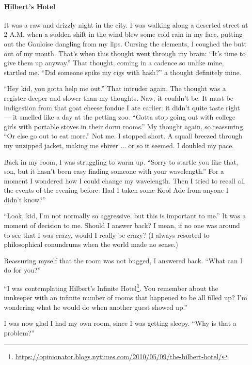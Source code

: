 \paragraph{Hilbert’s Hotel}

It was a raw and drizzly night in the city. I was walking along a deserted street at 2 A.M. when a sudden shift in the wind blew some cold rain in my face, putting out the Gauloise dangling from my lips. Cursing the elements, I coughed the butt out of my mouth. That's when this thought went through my brain: ``It's time to give them up anyway.'' That thought, coming in a cadence so unlike mine, startled me. ``Did someone spike my cigs with hash?'' a thought definitely mine.

``Hey kid, you gotta help me out.'' That intruder again. The thought was a register deeper and slower than my thoughts. Naw, it couldn't be. It must be indigestion from that goat cheese fondue I ate earlier; it didn't quite taste right --- it smelled like a day at the petting zoo. ``Gotta stop going out with college girls with portable stoves in their dorm rooms.'' My thought again, so reassuring. ``Or else go out to eat more.'' Not me. I stopped short. A squall breezed through my unzipped jacket, making me shiver ... or so it seemed. I doubled my pace.

Back in my room, I was struggling to warm up. ``Sorry to startle you like that, son, but it hasn't been easy finding someone with your wavelength.'' For a moment I wondered how I could change my wavelength. Then I tried to recall all the events of the evening before. Had I taken some Kool Ade from anyone I didn't know?''

``Look, kid, I'm not normally so aggressive, but this is important to me.'' It was a moment of decision to me. Should I answer back? I mean, if no one was around to see that I was crazy, would I really be crazy? (I always resorted to philosophical conundrums when the world made no sense.)

Reassuring myself that the room was not bugged, I answered back. ``What can I do for you?''

``I was contemplating Hilbert's Infinite Hotel\footnote{\url{https://opinionator.blogs.nytimes.com/2010/05/09/the-hilbert-hotel/}}. You remember about the innkeeper with an infinite number of rooms that happened to be all filled up? I'm wondering what he would do when another guest showed up.''

I was now glad I had my own room, since I was getting sleepy. ``Why is that a problem?''

